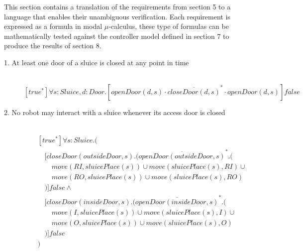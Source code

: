 
\newcommand{\tab}{\hspace{1em}}

This section contains a translation of the requirements from section 5 to a language that enables their unambiguous verification. Each requirement is expressed as a formula in modal $\mu$-calculus, these type of formulas can be mathematically tested against the controller model defined in section 7 to produce the results of section 8. 

\begin{description}
 \item[1. At least one door of a sluice is closed at any point in time]\mbox{}\\
\[
[true^*]\forall s:Sluice,d:Door.[openDoor(d, s) \cdot \overline{closeDoor(d, s)}^* \cdot openDoor(d, s)]\mathit{false}
\]


 \item[2. No robot may interact with a sluice whenever its access door is closed]\mbox{}\\
\begin{align*}
& [true^*]\forall s:Sluice.( \\
& \tab [closeDoor(outsideDoor, s).(\overline{openDoor(outsideDoor, s)}^*.( \\
& \tab\tab move(RI, sluicePlace(s)) \cup move(sluicePlace(s), RI) \cup \\
& \tab\tab move(RO, sluicePlace(s)) \cup move(sluicePlace(s), RO) \\
& \tab )]false \wedge \\
& \tab [closeDoor(insideDoor, s).(\overline{openDoor(insideDoor, s)}^*.( \\
& \tab\tab move(I, sluicePlace(s)) \cup move(sluicePlace(s), I) \cup \\
& \tab\tab move(O, sluicePlace(s)) \cup move(sluicePlace(s), O) \\
& \tab )]\mathit{false} \\
& )
\end{align*}
 
 \item[]
 

\end{description}
